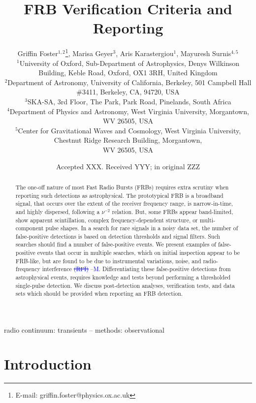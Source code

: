 \documentclass[a4paper,fleqn,usenatbib]{mnras}
\title[FRB Verification Criteria and Reporting]{FRB Verification Criteria and Reporting}
\author[G. Foster et al.]{
Griffin Foster$^{1,2}$\thanks{E-mail: griffin.foster@physics.ox.ac.uk},
Marisa Geyer$^{3}$,
Aris Karastergiou$^{1}$,
Mayuresh Surnis$^{4,5}$
\\
$^{1}$University of Oxford, Sub-Department of Astrophysics, Denys Wilkinson Building, Keble Road, Oxford, OX1 3RH, United Kingdom\\
$^{2}$Department of Astronomy, University of California, Berkeley, 501 Campbell
Hall \#3411, Berkeley, CA, 94720, USA\\
$^{3}$SKA-SA, 3rd Floor, The Park, Park Road, Pinelands, South Africa\\
$^{4}$Department of Physics and Astronomy, West Virginia University, Morgantown, WV 26505, USA\\
$^{5}$Center for Gravitational Waves and Cosmology, West Virginia University, Chestnut Ridge Research Building, Morgantown,\\ WV 26505, USA\\
}
\date{Accepted XXX. Received YYY; in original ZZZ}
\newcommand{\cMay}[1]{\textcolor{blue}{ #1 --M}}
\begin{document}
\label{firstpage}
\pagerange{\pageref{firstpage}--\pageref{lastpage}}
\maketitle

\begin{abstract}
The one-off nature of most Fast Radio Bursts (FRBs) requires extra scrutiny when
reporting such detections as astrophysical.  The prototypical FRB is a broadband
signal, that occurs over the extent of the receiver frequency range, is
narrow-in-time, and highly dispersed, following a $\nu^{-2}$ relation.  But,
some FRBs appear band-limited, show apparent scintillation, complex
frequency-dependent structure, or multi-component pulse shapes.  In a search for
rare signals in a noisy data set, the number of false-positive detections is
based on detection thresholds and signal filters.  Such searches should find a
number of false-positive events.  We present examples of false-positive events
that occur in multiple searches, which on initial inspection appear to be
FRB-like, but are found to be due to instrumental variations, noise, and
radio-frequency interference \cMay{\sout{(RFI)}}.  Differentiating these false-positive
detections from astrophysical events, requires knowledge and tests beyond
performing a thresholded single-pulse detection.  We discuss post-detection
analyses, verification tests, and data sets which should be provided when
reporting an FRB detection.
\end{abstract}

\begin{keywords}
radio continuum: transients -- methods: observational
\end{keywords}


\section{Introduction}
\label{sec:intro}
\end{document}
